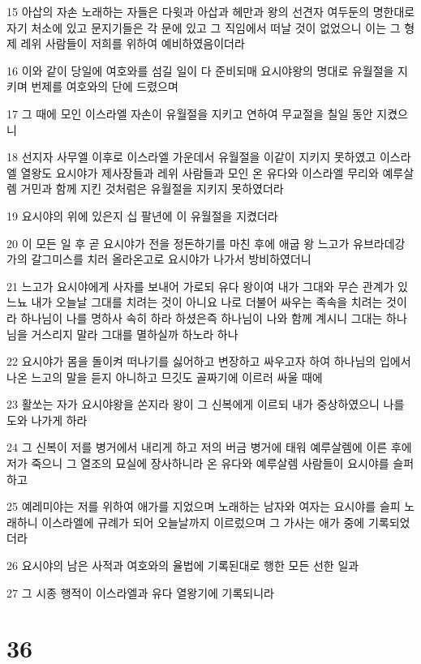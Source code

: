 \par 15 아삽의 자손 노래하는 자들은 다윗과 아삽과 헤만과 왕의 선견자 여두둔의 명한대로 자기 처소에 있고 문지기들은 각 문에 있고 그 직임에서 떠날 것이 없었으니 이는 그 형제 레위 사람들이 저희를 위하여 예비하였음이더라
\par 16 이와 같이 당일에 여호와를 섬길 일이 다 준비되매 요시야왕의 명대로 유월절을 지키며 번제를 여호와의 단에 드렸으며
\par 17 그 때에 모인 이스라엘 자손이 유월절을 지키고 연하여 무교절을 칠일 동안 지켰으니
\par 18 선지자 사무엘 이후로 이스라엘 가운데서 유월절을 이같이 지키지 못하였고 이스라엘 열왕도 요시야가 제사장들과 레위 사람들과 모인 온 유다와 이스라엘 무리와 예루살렘 거민과 함께 지킨 것처럼은 유월절을 지키지 못하였더라
\par 19 요시야의 위에 있은지 십 팔년에 이 유월절을 지켰더라
\par 20 이 모든 일 후 곧 요시야가 전을 정돈하기를 마친 후에 애굽 왕 느고가 유브라데강 가의 갈그미스를 치러 올라온고로 요시야가 나가서 방비하였더니
\par 21 느고가 요시야에게 사자를 보내어 가로되 유다 왕이여 내가 그대와 무슨 관계가 있느뇨 내가 오늘날 그대를 치려는 것이 아니요 나로 더불어 싸우는 족속을 치려는 것이라 하나님이 나를 명하사 속히 하라 하셨은즉 하나님이 나와 함께 계시니 그대는 하나님을 거스리지 말라 그대를 멸하실까 하노라 하나
\par 22 요시야가 몸을 돌이켜 떠나기를 싫어하고 변장하고 싸우고자 하여 하나님의 입에서 나온 느고의 말을 듣지 아니하고 므깃도 골짜기에 이르러 싸울 때에
\par 23 활쏘는 자가 요시야왕을 쏜지라 왕이 그 신복에게 이르되 내가 중상하였으니 나를 도와 나가게 하라
\par 24 그 신복이 저를 병거에서 내리게 하고 저의 버금 병거에 태워 예루살렘에 이른 후에 저가 죽으니 그 열조의 묘실에 장사하니라 온 유다와 예루살렘 사람들이 요시야를 슬퍼하고
\par 25 예레미야는 저를 위하여 애가를 지었으며 노래하는 남자와 여자는 요시야를 슬피 노래하니 이스라엘에 규례가 되어 오늘날까지 이르렀으며 그 가사는 애가 중에 기록되었더라
\par 26 요시야의 남은 사적과 여호와의 율법에 기록된대로 행한 모든 선한 일과
\par 27 그 시종 행적이 이스라엘과 유다 열왕기에 기록되니라

\chapter{36}

